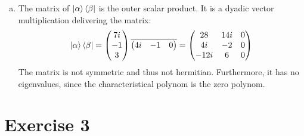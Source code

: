 \documentclass[a4paper,german,12pt,smallheadings]{scrartcl}
\begin{document}
\begin{enumerate}[(a)]
\item The matrix of $\ket{\alpha}\bra{\beta}$ is the outer scalar product. It is a dyadic vector multiplication delivering the matrix:
\begin{equation*}
\ket{\alpha}\bra{\beta}=\begin{pmatrix}
7i\\ -1 \\ 3
\end{pmatrix}\overline{\begin{pmatrix}4i & -1 & 0
\end{pmatrix}}=\begin{pmatrix}
28 & 14i & 0\\ 4i & -2 & 0\\ -12i & 6 & 0
\end{pmatrix}
\end{equation*}
The matrix is not symmetric and thus not hermitian. Furthermore, it has no eigenvalues, since the characteristical polynom is the zero polynom.

\end{enumerate}

\section*{Exercise 3}
\end{document}
